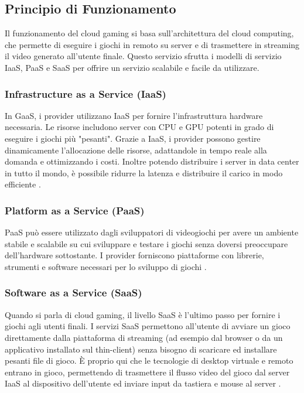 \documentclass[12pt,a4paper,openright,twoside]{book}
\begin{document}
\subsection{Principio di Funzionamento}
\label{subsec:funzionamento}

Il funzionamento del cloud gaming si basa sull'architettura del cloud computing, che permette di eseguire i giochi in remoto su server e di trasmettere in streaming il video generato all'utente finale. Questo servizio sfrutta i modelli di servizio \ac{IaaS}, PaaS e SaaS per offrire un servizio scalabile e facile da utilizzare.

\subsubsection{Infrastructure as a Service (IaaS)}
In GaaS, i provider utilizzano \ac{IaaS} per fornire l'infrastruttura hardware necessaria. Le risorse includono server con CPU e GPU potenti in grado di eseguire i giochi più "pesanti". Grazie a IaaS, i provider possono gestire dinamicamente l'allocazione delle risorse, adattandole in tempo reale alla domanda e ottimizzando i costi. Inoltre potendo distribuire i server in data center in tutto il mondo, è possibile ridurre la latenza e distribuire il carico in modo efficiente \cite{HARLE2023}.

\subsubsection{Platform as a Service (PaaS)}
PaaS può essere utilizzato dagli sviluppatori di videogiochi per avere un ambiente stabile e scalabile su cui sviluppare e testare i giochi senza doversi preoccupare dell'hardware sottostante. I provider forniscono piattaforme con librerie, strumenti e software necessari per lo sviluppo di giochi \cite{HARLE2023}.

\subsubsection{Software as a Service (SaaS)}
Quando si parla di cloud gaming, il livello SaaS è l'ultimo passo per fornire i giochi agli utenti finali. I servizi SaaS permettono all'utente di avviare un gioco direttamente dalla piattaforma di streaming (ad esempio dal browser o da un applicativo installato sul thin-client) senza bisogno di scaricare ed installare pesanti file di gioco. È proprio qui che le tecnologie di desktop virtuale e remoto entrano in gioco, permettendo di trasmettere il flusso video del gioco dal server IaaS al dispositivo dell'utente ed inviare input da tastiera e mouse al server \cite{HARLE2023}.
\end{document}

